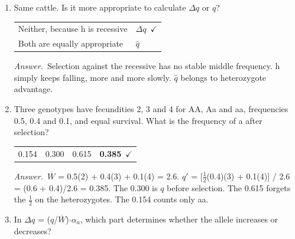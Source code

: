 \documentclass[11pt]{article}
\newcommand{\keyans}[1]{\par\medskip\noindent\textit{Answer.}\ #1\par\medskip}
\begin{document}
\begin{enumerate}[label=\textbf{\arabic*.}, leftmargin=2em, itemsep=1.4em]
\begin{tabularx}{\linewidth}{@{}YYYY@{}}
0.3 & \textbf{0.7}\ \(\checkmark\) & 1.3 & 0.0 \\
\end{tabularx}
\keyans{\(W\) = 1 \(-\) \(s\) = 1 \(-\) 0.3 = 0.7.}
\item Same cattle. Is it more appropriate to calculate \(\Delta q\) or \(\hat{q}\)?
\nopagebreak\par{}
\par\smallskip\noindent\begin{tabularx}{\linewidth}{@{}YY@{}}
Neither, because h is recessive & \textbf{\(\Delta q\)}\ \(\checkmark\) \\[3pt]
Both are equally appropriate & \(\hat{q}\) \\
\end{tabularx}
\keyans{Selection against the recessive has no stable middle frequency. h simply keeps falling, more and more slowly. \(\hat{q}\) belongs to heterozygote advantage.}
\item Three genotypes have fecundities 2, 3 and 4 for AA, Aa and aa, frequencies 0.5, 0.4 and 0.1, and equal survival. What is the frequency of a after selection?
\nopagebreak\par{}
\par\smallskip\noindent\begin{tabularx}{\linewidth}{@{}YYYY@{}}
0.154 & 0.300 & 0.615 & \textbf{0.385}\ \(\checkmark\) \\
\end{tabularx}
\keyans{\(\overline{W}\) = 0.5(2) + 0.4(3) + 0.1(4) = 2.6. \(q'\) = [\(\tfrac{1}{2}\)(0.4)(3) + 0.1(4)] / 2.6 = (0.6 + 0.4)/2.6 = 0.385. The 0.300 is \(q\) before selection. The 0.615 forgets the \(\tfrac{1}{2}\) on the heterozygotes. The 0.154 counts only aa.}
\item In \(\Delta q\) = (\(q\)/\(\overline{W}\))\(\cdot \alpha_{a}\), which part determines whether the allele increases or decreases?
\nopagebreak\par{}
\par\smallskip

\end{enumerate}
\end{document}
